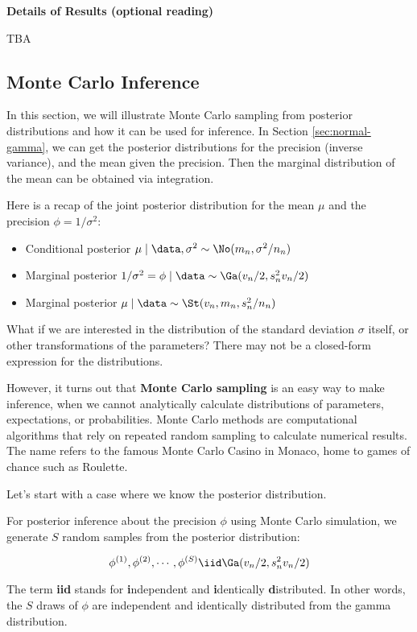 \documentclass[]{book}
\providecommand{\tightlist}{%
  \setlength{\itemsep}{0pt}\setlength{\parskip}{0pt}}
\theoremstyle{definition}
\theoremstyle{definition}
\theoremstyle{definition}
\theoremstyle{remark}
\begin{document}
\textbf{Details of Results (optional reading)}

TBA

\subsection{Monte Carlo Inference}\label{sec:NG-MC}

In this section, we will illustrate Monte Carlo sampling from posterior
distributions and how it can be used for inference. In Section
\ref{sec:normal-gamma}, we can get the posterior distributions for the
precision (inverse variance), and the mean given the precision. Then the
marginal distribution of the mean can be obtained via integration.

Here is a recap of the joint posterior distribution for the mean \(\mu\)
and the precision \(\phi = 1/\sigma^2\):

\begin{itemize}
\tightlist
\item
  Conditional posterior
  \(\mu \mid \data, \sigma^2 \sim \No(m_n, \sigma^2/n_n)\)
\item
  Marginal posterior
  \(1/\sigma^2 = \phi \mid \data \sim \Ga(v_n/2,s^2_n v_n/2)\)
\item
  Marginal posterior \(\mu \mid \data \sim \St(v_n, m_n, s^2_n/n_n)\)
\end{itemize}

What if we are interested in the distribution of the standard deviation
\(\sigma\) itself, or other transformations of the parameters? There may
not be a closed-form expression for the distributions.

However, it turns out that \textbf{Monte Carlo sampling} is an easy way
to make inference, when we cannot analytically calculate distributions
of parameters, expectations, or probabilities. Monte Carlo methods are
computational algorithms that rely on repeated random sampling to
calculate numerical results. The name refers to the famous Monte Carlo
Casino in Monaco, home to games of chance such as Roulette.

Let's start with a case where we know the posterior distribution.

For posterior inference about the precision \(\phi\) using Monte Carlo
simulation, we generate \(S\) random samples from the posterior
distribution:

\[\phi^{(1)},\phi^{(2)},\cdots,\phi^{(S)} \iid \Ga(v_n/2,s^2_n v_n/2)\]

The term \textbf{iid} stands for \textbf{i}ndependent and
\textbf{i}dentically \textbf{d}istributed. In other words, the \(S\)
draws of \(\phi\) are independent and identically distributed from the
gamma distribution.
\end{document}
